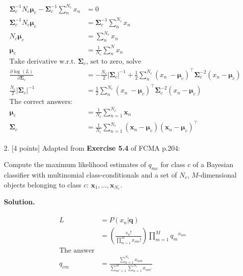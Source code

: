 \documentclass[10pt]{article}
\begin{document}
\begin{itemize}
\begin{eqnarray*}
\begin{aligned}
\\
\boldsymbol {\Sigma}_c^{-1} N_c \boldsymbol {\mu}_c - \boldsymbol {\Sigma}_c^{-1} \sum_n^{N_c} x_n &= 0
\\
\boldsymbol {\Sigma}_c^{-1} N_c \boldsymbol {\mu}_c &= \boldsymbol {\Sigma}_c^{-1} \sum_n^{N_c} x_n
\\
N_c \boldsymbol {\mu}_c &= \sum_n^{N_c} x_n
\\
\boldsymbol {\mu}_c &= \frac{1}{N_c} \sum_n^N  x_n 
\\
%
%
\text{Take derivative w.r.t. $\boldsymbol {\Sigma}_c$, set to zero, solve}
\\
\frac{\partial \log(L)}{\partial \boldsymbol {\Sigma}_c} 
&=
- \frac{N_c}{2} {| \boldsymbol {\Sigma}_c |}^{-1} 
+ \frac{1}{2} 
\sum_n^{N_c} (x_n\ - \boldsymbol {\mu}_c)^\top \boldsymbol {\Sigma}_c^{-2} (x_n - \boldsymbol {\mu}_c)
\\
\frac{N_c}{2} {| \boldsymbol {\Sigma}_c |}^{-1} &=
\frac{1}{2} 
\sum_n^{N_c} (x_n\ - \boldsymbol {\mu}_c)^\top \boldsymbol {\Sigma}_c^{-2} (x_n - \boldsymbol {\mu}_c)
%
%
\\
\text{The correct answers:}
\\
\boldsymbol{\mu}_c &= \frac{1}{N_c} \sum_{n=1}^{N_c} \mathbf{x}_n
\\
\boldsymbol{\Sigma}_c &= 
\frac{1}{N_c} \sum_{n=1}^{N_c} (\mathbf{x}_n - \boldsymbol{\mu}_c) 
(\mathbf{x}_n - \boldsymbol{\mu}_c)^\top
\end{aligned}
\end{eqnarray*}


\item[2.]  [4 points]
Adapted from {\bf Exercise 5.4} of FCMA p.204:

Compute the maximum likelihood estimates of $q_{mc}$ for class $c$ of a Bayesian classifier with multinomial class-conditionals and a set of $N_c$, $M$-dimensional objects belonging to class $c$: $\mathbf{x}_1, ..., \mathbf{x}_{N_c}$.

{\bf Solution.} %

\begin{eqnarray*}
\begin{aligned}
L &= P(x_n | \mathbf{q})
\\
&= \left( \frac{s_n !}{\prod_{m=1}^M x_{nm} !} \right)
\prod_{m=1}^M {q_m}^{x_{nm}}
\\
\text{The answer}
\\
q_{cm} &= \frac{ \sum_{n=1}^{N_c} x_{nm} } { \sum_{m'=1}^M \sum_{n=1}^{N_c} x_{nm'} }
\end{aligned}
\end{eqnarray*}



\end{itemize}
\end{document}
